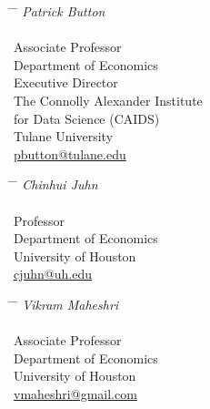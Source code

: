 \documentclass[letterpaper]{article}
\begin{document}
\parbox[t]{0.32\textwidth}{
\begin{tabbing}
\hspace{2.75cm} \= \hspace{4cm} \= \kill
{\textit{Patrick Button }}  \\\\
Associate Professor \\
Department of Economics \\
Executive Director \\
The Connolly Alexander Institute \\
for Data Science (CAIDS) \\
{Tulane University}\\ 
{\href{mailto:pbutton@tulane.edu}{pbutton@tulane.edu}}
\end{tabbing}}
\hfill
\parbox[t]{0.32\textwidth}{
\begin{tabbing}
\hspace{2.75cm} \= \hspace{4cm} \= \kill
{\textit{Chinhui Juhn }} \\\\
Professor \\
Department of Economics \\
{University of Houston}\\ 
{\href{mailto:cjuhn@uh.edu}{cjuhn@uh.edu}}
\end{tabbing}}
\hfill
\parbox[t]{0.32\textwidth}{ 
\begin{tabbing}
\hspace{2.75cm} \= \hspace{4cm} \= \kill
{\textit{Vikram Maheshri} } \\\\
Associate Professor \\
Department of Economics \\
{University of Houston}\\ 
{\href{mailto:vmaheshri@gmail.com}{vmaheshri@gmail.com}}
\end{tabbing}}

\vspace{0.7cm}
\end{document}
